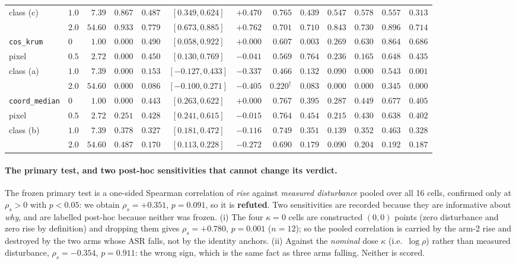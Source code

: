 \documentclass{article}
\begin{document}
\begin{table}[h]
\begin{tabular}{llrrrcrrrrrrr}
class (c) & $1.0$ & $7.39$ & $0.867$ & $0.487$ & $[0.349, 0.624]$ & $+0.470$ & $0.765$ & $0.439$ & $0.547$ & $0.578$ & $0.557$ & $0.313$ \\
 & $2.0$ & $54.60$ & $0.933$ & $0.779$ & $[0.673, 0.885]$ & $+0.762$ & $0.701$ & $0.710$ & $0.843$ & $0.730$ & $0.896$ & $0.714$ \\
\midrule
\texttt{cos\_krum} & $0$ & $1.00$ & $0.000$ & $0.490$ & $[0.058, 0.922]$ & $+0.000$ & $0.607$ & $0.003$ & $0.269$ & $0.630$ & $0.864$ & $0.686$ \\
pixel & $0.5$ & $2.72$ & $0.000$ & $0.450$ & $[0.130, 0.769]$ & $-0.041$ & $0.569$ & $0.764$ & $0.236$ & $0.165$ & $0.648$ & $0.435$ \\
class (a) & $1.0$ & $7.39$ & $0.000$ & $0.153$ & $[-0.127, 0.433]$ & $-0.337$ & $0.466$ & $0.132$ & $0.090$ & $0.000$ & $0.543$ & $0.001$ \\
 & $2.0$ & $54.60$ & $0.000$ & $0.086$ & $[-0.100, 0.271]$ & $-0.405$ & $0.220^{\dagger}$ & $0.083$ & $0.000$ & $0.000$ & $0.345$ & $0.000$ \\
\midrule
\texttt{coord\_median} & $0$ & $1.00$ & $0.000$ & $0.443$ & $[0.263, 0.622]$ & $+0.000$ & $0.767$ & $0.395$ & $0.287$ & $0.449$ & $0.677$ & $0.405$ \\
pixel & $0.5$ & $2.72$ & $0.251$ & $0.428$ & $[0.241, 0.615]$ & $-0.015$ & $0.764$ & $0.454$ & $0.215$ & $0.430$ & $0.638$ & $0.402$ \\
class (b) & $1.0$ & $7.39$ & $0.378$ & $0.327$ & $[0.181, 0.472]$ & $-0.116$ & $0.749$ & $0.351$ & $0.139$ & $0.352$ & $0.463$ & $0.328$ \\
 & $2.0$ & $54.60$ & $0.487$ & $0.170$ & $[0.113, 0.228]$ & $-0.272$ & $0.690$ & $0.179$ & $0.090$ & $0.204$ & $0.192$ & $0.187$ \\
\bottomrule
\end{tabular}
\end{table}

\paragraph{The primary test, and two post-hoc sensitivities that cannot change its verdict.} The frozen primary test is a one-sided Spearman correlation of \emph{rise} against \emph{measured disturbance} pooled over all 16 cells, confirmed only at $\rho_s > 0$ with $p < 0.05$: we obtain $\rho_s = +0.351$, $p = 0.091$, so it is \textbf{refuted}. Two sensitivities are recorded because they are informative about \emph{why}, and are labelled post-hoc because neither was frozen. (i) The four $\kappa{=}0$ cells are constructed $(0,0)$ points (zero disturbance and zero rise by definition) and dropping them gives $\rho_s = +0.780$, $p = 0.001$ ($n{=}12$); so the pooled correlation is carried by the arm-2 rise and destroyed by the two arms whose ASR falls, not by the identity anchors. (ii) Against the \emph{nominal} dose $\kappa$ (i.e.\ $\log \rho$) rather than measured disturbance, $\rho_s = -0.354$, $p = 0.911$: the wrong sign, which is the same fact as three arms falling. Neither is scored.
\end{document}
